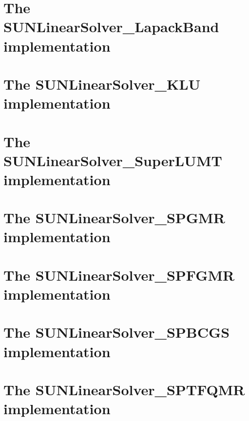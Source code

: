 \section{The SUNLinearSolver\_LapackBand implementation}\label{ss:sunlinsol_lapband}


\section{The SUNLinearSolver\_KLU implementation}\label{ss:sunlinsol_klu}


\section{The SUNLinearSolver\_SuperLUMT implementation}\label{ss:sunlinsol_superlumt}


\section{The SUNLinearSolver\_SPGMR implementation}\label{ss:sunlinsol_spgmr}


\section{The SUNLinearSolver\_SPFGMR implementation}\label{ss:sunlinsol_spfgmr}


\section{The SUNLinearSolver\_SPBCGS implementation}\label{ss:sunlinsol_spbcgs}


\section{The SUNLinearSolver\_SPTFQMR implementation}\label{ss:sunlinsol_sptfqmr}


